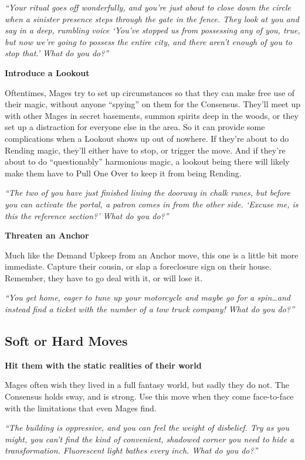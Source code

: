 \documentclass[10pt,twoside,openright]{memoir}
\begin{document}
\emph{``Your ritual goes off wonderfully, and you're just about to close
down the circle when a sinister presence steps through the gate in the
fence. They look at you and say in a deep, rumbling voice `You've
stopped us from possessing any of you, true, but now we're going to
possess the entire city, and there aren't enough of you to stop that.'
What do you do?''}

\textbf{Introduce a Lookout}

Oftentimes, Mages try to set up circumstances so that they can make free
use of their magic, without anyone ``spying'' on them for the Consensus.
They'll meet up with other Mages in secret basements, summon spirits
deep in the woods, or they set up a distraction for everyone else in the
area. So it can provide some complications when a Lookout shows up out
of nowhere. If they're about to do Rending magic, they'll either have to
stop, or trigger the move. And if they're about to do ``questionably''
harmonious magic, a lookout being there will likely make them have to
Pull One Over to keep it from being Rending.

\emph{``The two of you have just finished lining the doorway in chalk
runes, but before you can activate the portal, a patron comes in from
the other side. `Excuse me, is this the reference section?' What do you
do?''}

\textbf{Threaten an Anchor}

Much like the Demand Upkeep from an Anchor move, this one is a little
bit more immediate. Capture their cousin, or slap a foreclosure sign on
their house. Remember, they have to go deal with it, or will lose it.

\emph{``You get home, eager to tune up your motorcycle and maybe go for
a spin\ldots and instead find a ticket with the number of a tow truck
company! What do you do?''}

\hypertarget{soft-or-hard-moves}{%
\subsection{Soft or Hard Moves}\label{soft-or-hard-moves}}

\textbf{Hit them with the static realities of their world}

Mages often wish they lived in a full fantasy world, but sadly they do
not. The Consensus holds sway, and is strong. Use this move when they
come face-to-face with the limitations that even Mages find.

\emph{``The building is oppressive, and you can feel the weight of
disbelief. Try as you might, you can't find the kind of convenient,
shadowed corner you need to hide a transformation. Fluorescent light
bathes every inch. What do you do?''}
\end{document}
